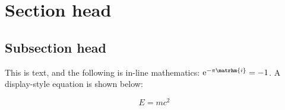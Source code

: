 \documentclass[12pt]{article}
\begin{document}
\section{Section head}
\subsection{Subsection head}

This is text, and the following is in-line mathematics: 
$\mathrm{e}^{-\pi\matrhm{i}} = -1$. 
A display-style equation is shown below:

\begin{equation}
  E = mc^2
\end{equation}
\end{document}

